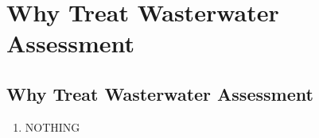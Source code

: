 
\chapter{Why Treat Wasterwater Assessment}
\section*{Why Treat Wasterwater Assessment}
\begin{enumerate}[1.]
\item NOTHING
\end{enumerate}


